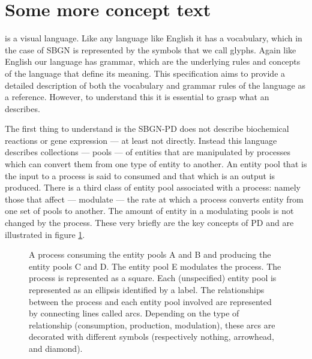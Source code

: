 \section{Some more concept text}

\SBGNPDLone is a visual language. Like any language like English it has a vocabulary, which in the case of SBGN is represented by the symbols that we call glyphs. Again like English our language has grammar, which are the underlying rules and concepts of the language that define its meaning. This specification aims to provide a detailed description of both the vocabulary and grammar rules of the language as a reference. However, to understand this it is essential to grasp what an \PDm describes.

The first thing to understand is the SBGN-PD does not describe biochemical reactions or gene expression --- at least not directly. Instead this language describes collections --- pools --- of entities that are manipulated by processes which can convert them from one type of entity to another. An entity pool that is the input to a process is said to consumed and that which is an output is produced. There is a third class of entity pool associated with a process: namely those that affect --- modulate --- the rate at which a process converts entity from one set of pools to another. The amount of entity in a modulating pools is not changed by the process. These very briefly are the key concepts of PD and are illustrated in figure \ref{fig:keyconcepts}.

\begin{figure}[htb]
\begin{center}
\caption{A process consuming the entity pools A and B and producing the entity pools C and D. The entity pool E modulates the process. The process is represented as a square. Each (unspecified) entity pool is represented as an ellipsis identified by a label. The relationships between the process and each entity pool involved are represented by connecting lines called arcs. Depending on the type of relationship (consumption, production, modulation), these arcs are decorated with different symbols (respectively nothing, arrowhead, and diamond).}\label{fig:keyconcepts}
\end{center}
\end{figure}

